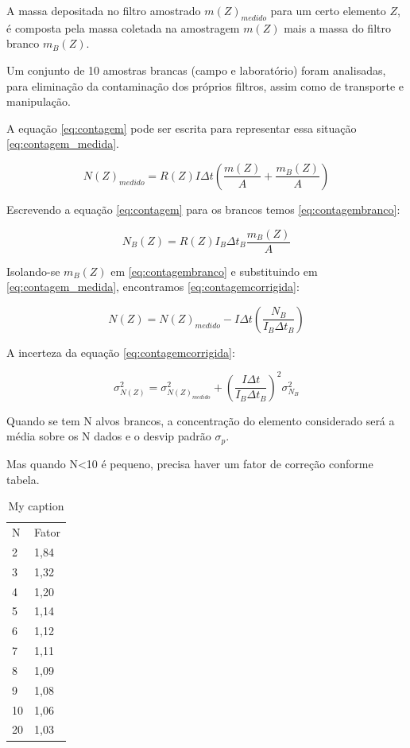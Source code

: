 A massa depositada no filtro amostrado $m(Z)_{medido}$ para um certo 
elemento $Z$, é composta pela massa coletada na amostragem $m(Z)$ 
mais a massa do filtro branco $m_{B}(Z)$. 

Um conjunto de 10 amostras brancas (campo e laboratório) foram analisadas, 
para eliminação da contaminação dos próprios filtros, assim como de 
transporte e manipulação.

A equação \ref{eq:contagem} pode ser escrita para representar essa situação
\ref{eq:contagem_medida}. 

\begin{equation}
  \label{eq:contagem_medida}
  N(Z)_{medido} = R(Z) I\Delta t \left( \frac{m(Z)}{A} + \frac{m_B(Z)}{A} \right)
\end{equation}  

Escrevendo a equação \ref{eq:contagem} para os brancos temos \ref{eq:contagembranco}:

\begin{equation}
  \label{eq:contagembranco}
  N_B(Z) = R(Z) I_B\Delta t_B \frac{m_B(Z)}{A}
\end{equation}

Isolando-se $m_B(Z)$ em \ref{eq:contagembranco} e substituindo em 
\ref{eq:contagem_medida}, encontramos \ref{eq:contagemcorrigida}:
 
\begin{equation}
  \label{eq:contagemcorrigida}
  N(Z) = N(Z)_{medido} - I\Delta t \left( \frac{N_B}{I_B \Delta t_B} \right)
\end{equation}


A incerteza da equação \ref{eq:contagemcorrigida}:

\begin{equation}
  \label{eq:erro_contagemcorrigida}
  \sigma_{N(Z)}^2 = \sigma_{N(Z)_{medido}}^2 + \left( \frac{I \Delta t}{I_B \Delta t_B} \right)^2 \sigma_{N_B}^2
\end{equation}



Quando se tem N alvos brancos, a concentração do elemento 
considerado será a média sobre os N dados e o desvip padrão $\sigma_p$.

Mas quando N<10 é pequeno, precisa haver um fator de correção conforme tabela.

\begin{table}[H]
\centering
\caption{My caption}
\label{my-label}
\begin{tabular}{ll}
N  & Fator \\
2  & 1,84  \\
3  & 1,32  \\
4  & 1,20  \\
5  & 1,14  \\
6  & 1,12  \\
7  & 1,11  \\
8  & 1,09  \\
9  & 1,08  \\
10 & 1,06  \\
20 & 1,03 
\end{tabular}
\end{table}

